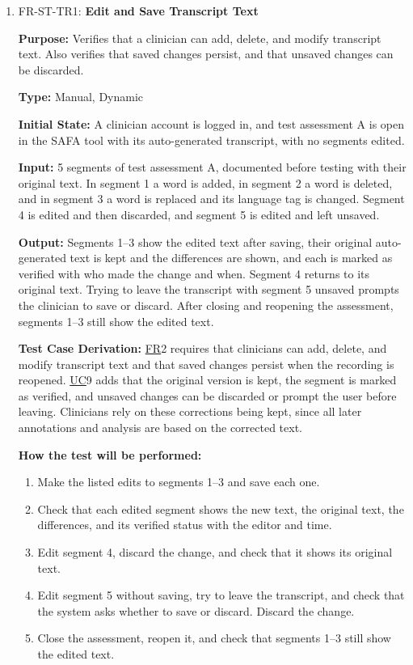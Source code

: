 \documentclass[12pt, titlepage]{article}
\newcommand{\srsfr}[1]{\href{https://github.com/Nour-Fawaz/MacaBoca/blob/main/pdfs/SRS/SRS.pdf}{FR}}
\newcommand{\srsuc}[1]{\href{https://github.com/Nour-Fawaz/MacaBoca/blob/main/pdfs/SRS/SRS.pdf}{UC}}
\renewcommand{\_}{\oldunderscore\allowbreak}
\begin{document}
\begin{enumerate}
  \item FR-ST-TR1: \textbf{Edit and Save Transcript Text\\}
  \begin{mdframed}[linewidth=0.5mm]
      \textbf{Purpose:} Verifies that a clinician can add, delete, and modify transcript text. Also verifies that saved changes persist, and that unsaved changes can be discarded.\par
      \textbf{Type:} Manual, Dynamic \par
      \textbf{Initial State:} A clinician account is logged in, and test assessment A is open in the SAFA tool with its auto-generated transcript, with no segments edited. \par
      \textbf{Input:} 5 segments of test assessment A, documented before testing with their original text. In segment 1 a word is added, in segment 2 a word is deleted, and in segment 3 a word is replaced and its language tag is changed. Segment 4 is edited and then discarded, and segment 5 is edited and left unsaved. \par
      \textbf{Output:} Segments 1--3 show the edited text after saving, their original auto-generated text is kept and the differences are shown, and each is marked as verified with who made the change and when. Segment 4 returns to its original text. Trying to leave the transcript with segment 5 unsaved prompts the clinician to save or discard. After closing and reopening the assessment, segments 1--3 still show the edited text. \par
      \textbf{Test Case Derivation:} \srsfr*{2} requires that clinicians can add, delete, and modify transcript text and that saved changes persist when the recording is reopened. \srsuc*{9} adds that the original version is kept, the segment is marked as verified, and unsaved changes can be discarded or prompt the user before leaving. Clinicians rely on these corrections being kept, since all later annotations and analysis are based on the corrected text. \par
      \textbf{How the test will be performed:}
      \begin{enumerate}
        \item[1.] Make the listed edits to segments 1--3 and save each one.
        \item[2.] Check that each edited segment shows the new text, the original text, the differences, and its verified status with the editor and time.
        \item[3.] Edit segment 4, discard the change, and check that it shows its original text.
        \item[4.] Edit segment 5 without saving, try to leave the transcript, and check that the system asks whether to save or discard. Discard the change.
        \item[5.] Close the assessment, reopen it, and check that segments 1--3 still show the edited text.
      \end{enumerate}
  \end{mdframed}


\end{enumerate}
\end{document}
